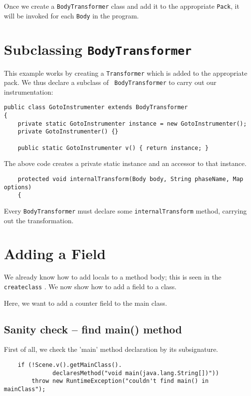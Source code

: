 \documentclass{article}
\begin{document}
Once we create a {\tt BodyTransformer} class and add it to the appropriate
{\tt Pack}, it will be invoked for each {\tt Body} in the program.

\section{Subclassing {\tt BodyTransformer}}

This example works by creating a {\tt Transformer} which is added to
the appropriate pack.  We thus declare a subclass of {\tt
BodyTransformer} to carry out our instrumentation:

\begin{verbatim}
public class GotoInstrumenter extends BodyTransformer
{
    private static GotoInstrumenter instance = new GotoInstrumenter();
    private GotoInstrumenter() {}

    public static GotoInstrumenter v() { return instance; }
\end{verbatim}

The above code creates a private static instance and an accessor to that
instance.

\begin{verbatim}
    protected void internalTransform(Body body, String phaseName, Map options)
    {
\end{verbatim}

Every {\tt BodyTransformer} must declare some {\tt internalTransform}
method, carrying out the transformation.

\section{Adding a Field}

We already know how to add locals to a method body; this is seen in
the {\tt createclass}
.
We now show how to add a field to a class.

Here, we want to add a counter field to the main class.

\subsection{Sanity check -- find main() method}

First of all, we check the 'main' method declaration by its subsignature.
\begin{verbatim}
    if (!Scene.v().getMainClass().
              declaresMethod("void main(java.lang.String[])"))
        throw new RuntimeException("couldn't find main() in mainClass");
\end{verbatim}
\end{document}
